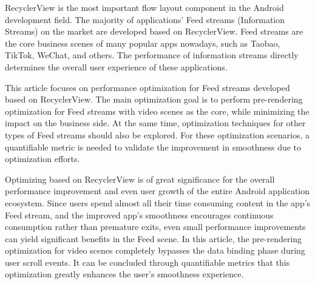 RecyclerView is the most important flow layout component in the Android development field. The majority of applications' Feed streams (Information Streams) on the market are developed based on RecyclerView. Feed streams are the core business scenes of many popular apps nowadays, such as Taobao, TikTok, WeChat, and others. The performance of information streams directly determines the overall user experience of these applications.

This article focuses on performance optimization for Feed streams developed based on RecyclerView. The main optimization goal is to perform pre-rendering optimization for Feed streams with video scenes as the core, while minimizing the impact on the business side. At the same time, optimization techniques for other types of Feed streams should also be explored. For these optimization scenarios, a quantifiable metric is needed to validate the improvement in smoothness due to optimization efforts.

Optimizing based on RecyclerView is of great significance for the overall performance improvement and even user growth of the entire Android application ecosystem. Since users spend almost all their time consuming content in the app's Feed stream, and the improved app's smoothness encourages continuous consumption rather than premature exits, even small performance improvements can yield significant benefits in the Feed scene. In this article, the pre-rendering optimization for video scenes completely bypasses the data binding phase during user scroll events. It can be concluded through quantifiable metrics that this optimization greatly enhances the user's smoothness experience.



